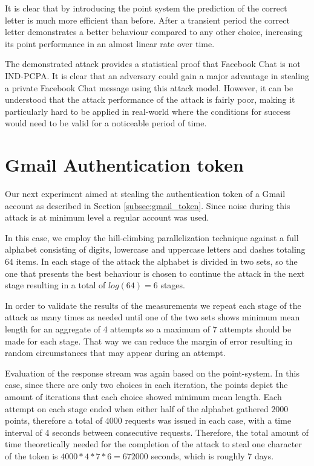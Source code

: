 It is clear that by introducing the point system the prediction of the correct
letter is much more efficient than before. After a transient period the correct
letter demonstrates a better behaviour compared to any other choice, increasing
its point performance in an almost linear rate over time.

The demonstrated attack provides a statistical proof that Facebook Chat is not
IND-PCPA. It is clear that an adversary could gain a major advantage in stealing a
private Facebook Chat message using this attack model. However, it can be
understood that the attack performance of the attack is fairly poor, making it
particularly hard to be applied in real-world where the conditions for success
would need to be valid for a noticeable period of time.

\section{Gmail Authentication token}\label{sec:gmail_experiment}

Our next experiment aimed at stealing the authentication token of a Gmail
account as described in Section \ref{subsec:gmail_token}. Since noise during
this attack is at minimum level a regular account was used.

In this case, we employ the hill-climbing parallelization technique against a
full alphabet consisting of digits, lowercase and uppercase letters and dashes
totaling 64 items. In each stage of the attack the alphabet is divided in two
sets, so the one that presents the best behaviour is chosen to continue the
attack in the next stage resulting in a total of \begin{math}log(64) =
6\end{math} stages.

In order to validate the results of the measurements we repeat each stage of the
attack as many times as needed until one of the two sets shows minimum mean
length for an aggregate of 4 attempts so a maximum of 7 attempts should be made
for each stage. That way we can reduce the margin of error resulting in random
circumstances that may appear during an attempt.

Evaluation of the response stream was again based on the point-system. In this
case, since there are only two choices in each iteration, the points depict the
amount of iterations that each choice showed minimum mean length. Each attempt
on each stage ended when either half of the alphabet gathered
\begin{math}2000\end{math} points, therefore a total of
\begin{math}4000\end{math} requests was issued in each case, with a time
interval of 4 seconds between consecutive requests. Therefore, the
total amount of time theoretically needed for the completion of the attack to
steal one character of the token is \begin{math}4000*4*7*6 = 672000\end{math}
seconds, which is roughly 7 days.

